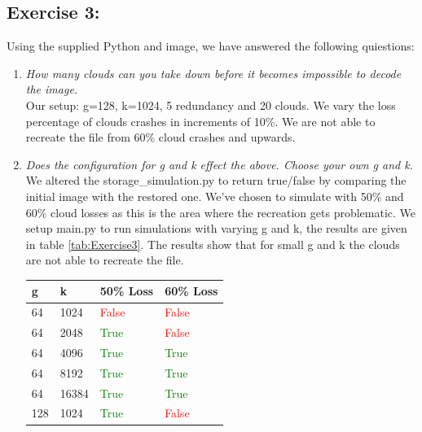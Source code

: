 \subsection{Exercise 3:}
Using the supplied Python and image, we have answered the following quiestions:
\begin{enumerate}
    \item \textit{How many clouds can you take down before it becomes impossible to decode the image.}\\
    Our setup: g=128, k=1024, 5 redundancy and 20 clouds.
    We vary the loss percentage of clouds crashes in increments of 10\%. We are not able to recreate the file from 60\% cloud crashes and upwards.
    \item \textit{Does the configuration for g and k effect the above. Choose your own g and k.}\\
    We altered the storage\_simulation.py to return true/false by comparing the initial image with the restored one.
    We've chosen to simulate with 50\% and 60\% cloud losses as this is the area where the recreation gets problematic.
    We setup main.py to run simulations with varying g and k, the results are given in table \cref{tab:Exercise3}.
    The results show that for small g and k the clouds are not able to recreate the file.
    \begin{table}[H]
        \begin{tabularx}{\textwidth}{|Y|Y|Y|Y|}
            \hline
            g & k & 50\% Loss & 60\% Loss \\\hline
            64 & 1024 & \textcolor{red}{False}& \textcolor{red}{False}\\\hline
            64 & 2048 & \textcolor{green}{True} & \textcolor{red}{False}\\\hline
            64 & 4096 & \textcolor{green}{True} & \textcolor{green}{True}\\\hline
            64 & 8192 & \textcolor{green}{True} & \textcolor{green}{True}\\\hline
            64 & 16384 & \textcolor{green}{True} & \textcolor{green}{True}\\\hline
            128 & 1024 & \textcolor{green}{True} & \textcolor{red}{False}\\\hline

\end{tabularx}
\end{table}
\end{enumerate}
